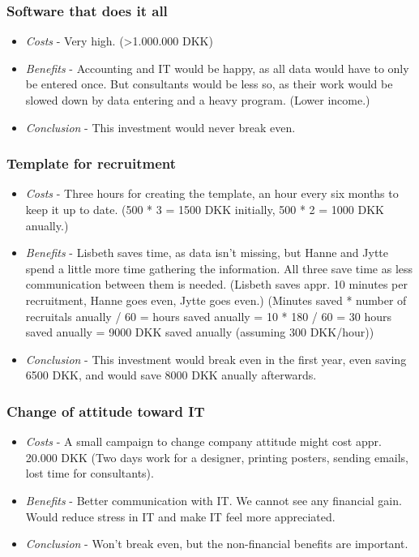 \subsubsection{Software that does it all}
\begin{itemize}
\item \emph{Costs} - Very high. (\textgreater 1.000.000 DKK)
\item \emph{Benefits} - Accounting and IT would be happy, as all data would have to only be entered once. But consultants would be less so, as their work would be slowed down by data entering and a heavy program. (Lower income.)
\item \emph{Conclusion} - This investment would never break even.
\end{itemize}

\subsubsection{Template for recruitment}
\begin{itemize}
\item \emph{Costs} - Three hours for creating the template, an hour every six months to keep it up to date. (500 * 3 = 1500 DKK initially, 500 * 2 = 1000 DKK anually.)
\item \emph{Benefits} - Lisbeth saves time, as data isn't missing, but Hanne and Jytte spend a little more time gathering the information. All three save time as less communication between them is needed. (Lisbeth saves appr. 10 minutes per recruitment, Hanne goes even, Jytte goes even.) (Minutes saved * number of recruitals anually / 60 = hours saved anually = 10 * 180 / 60 = 30 hours saved anually = 9000 DKK saved anually (assuming 300 DKK/hour))
\item \emph{Conclusion} - This investment would break even in the first year, even saving 6500 DKK, and would save 8000 DKK anually afterwards.
\end{itemize}

\subsubsection{Change of attitude toward IT}
\begin{itemize}
\item \emph{Costs} - A small campaign to change company attitude might cost appr. 20.000 DKK (Two days work for a designer, printing posters, sending emails, lost time for consultants).
\item \emph{Benefits} - Better communication with IT. We cannot see any financial gain. Would reduce stress in IT and make IT feel more appreciated.
\item \emph{Conclusion} - Won't break even, but the non-financial benefits are important.
\end{itemize}

